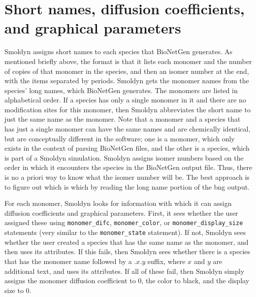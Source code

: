 \documentclass {book}
\newcommand {\ttt} {\texttt}
\begin{document}
\section{Short names, diffusion coefficients, and graphical parameters}

Smoldyn assigns short names to each species that BioNetGen generates. As mentioned briefly above, the format is that it lists each monomer and the number of copies of that monomer in the species, and then an isomer number at the end, with the items separated by periods. Smoldyn gets the monomer names from the species' long names, which BioNetGen generates. The monomers are listed in alphabetical order. If a species has only a single monomer in it and there are no modification sites for this monomer, then Smoldyn abbreviates the short name to just the same name as the monomer. Note that a monomer and a species that has just a single monomer can have the same names and are chemically identical, but are conceptually different in the software; one is a monomer, which only exists in the context of parsing BioNetGen files, and the other is a species, which is part of a Smoldyn simulation. Smoldyn assigns isomer numbers based on the order in which it encounters the species in the BioNetGen output file. Thus, there is no a priori way to know what the isomer number will be. The best approach is to figure out which is which by reading the long name portion of the bng output.

For each monomer, Smoldyn looks for information with which it can assign diffusion coefficients and graphical parameters. First, it sees whether the user assigned these using \ttt{monomer\_difc}, \ttt{monomer\_color}, or \ttt{monomer\_display\_size} statements (very similar to the \ttt{monomer\_state} statement). If not, Smoldyn sees whether the user created a species that has the same name as the monomer, and then uses its attributes. If this fails, then Smoldyn sees whether there is a species that has the monomer name followed by a .$x$.$y$ suffix, where $x$ and $y$ are additional text, and uses its attributes. If all of these fail, then Smoldyn simply assigns the monomer diffusion coefficient to 0, the color to black, and the display size to 0.
\end{document}
